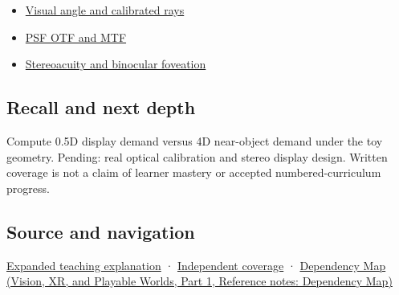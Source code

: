 \hypertarget{appendix-f90cee1be7a4-used-by}{}

\begin{itemize}
\tightlist
\item
  \hyperref[appendix-7d356c396d1a]{Visual angle and calibrated rays}
\item
  \hyperref[appendix-8b76b0efd27f]{PSF OTF and MTF}
\item
  \hyperref[appendix-8dc848f14052]{Stereoacuity and binocular foveation}
\end{itemize}

\subsection{Recall and next depth}\label{appendix-f90cee1be7a4-recall-and-next-depth}

\hypertarget{appendix-f90cee1be7a4-recall-and-next-depth}{}

Compute 0.5D display demand versus 4D near-object demand under the toy geometry. Pending: real optical calibration and stereo display design. Written coverage is not a claim of learner mastery or accepted numbered-curriculum progress.

\subsection{Source and navigation}\label{appendix-f90cee1be7a4-source-and-navigation}

\hypertarget{appendix-f90cee1be7a4-source-and-navigation}{}

\hyperref[04-visual-computing-ii-ch042-focus-and-stereo-can-disagree-even-when-the-images-are-sharp]{Expanded teaching explanation} · \hyperref[appendix-fd090d982a15-xr01---independent-seeing-and-representation-source]{Independent coverage} · \href{../07-Vision-XR-and-Playable-Worlds-P01/main.pdf\#appendix-4ad47bdd269a}{Dependency Map (Vision, XR, and Playable Worlds, Part 1, Reference notes: Dependency Map)}
